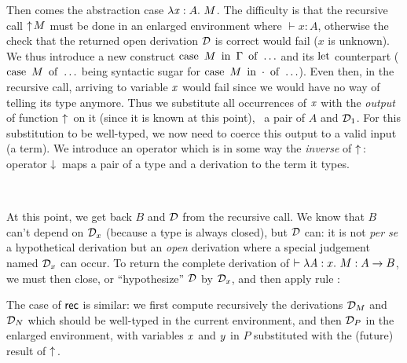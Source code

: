 \documentclass[9pt]{sigplanconf}
\begin{document}
Then comes the abstraction case $\lambda{\ensuremath{\text{\textit{x}}}}:{A}.\  M$. The difficulty is that
the recursive call $\uparrow\!{M}$ must be done in an enlarged
environment where $\vdash x : A$, otherwise the check that the
returned open derivation $\mathcal D$ is correct would fail ($x$ is
unknown). We thus introduce a new construct $\operatorname{case}\ {{M}\ \operatorname{in}\ {\Gamma}}\ \operatorname{of}\  \ldots$
and its $\operatorname{let}$ counterpart ($\operatorname{case}\ {M}\ \operatorname{of}\  \ldots$ being syntactic
sugar for $\operatorname{case}\ {{M}\ \operatorname{in}\ {\cdot}}\ \operatorname{of}\  \ldots$). Even then, in the recursive
call, arriving to variable $\text{\textit{x}}$ would fail since we would have no
way of telling its type anymore. Thus we substitute all occurrences of
$\text{\textit{x}}$ with the \emph{output} of function $\uparrow\!{}$ on it (since
it is known at this point), \ie\ a pair of $A$ and $\mathcal D_1$. For this
substitution to be well-typed, we now need to coerce this output to a
valid input (a term). We introduce an operator which is in some way
the \emph{inverse} of $\uparrow\!{}$: operator $\downarrow\!{}$ maps a pair of a
type and a derivation to the term it types.

\begin{mathleft}
  \quad{} \\
  \quad\quad
  {}
\end{mathleft}

At this point, we get back $B$ and $\mathcal D$ from the recursive call. We
know that $B$ can't depend on $\mathcal D_x$ (because a type is always
closed), but $\mathcal D$ can: it is not \emph{per se} a hypothetical
derivation but an \emph{open} derivation where a special judgement
named $\mathcal D_x$ can occur. To return the complete derivation of
$\vdash\lambda{\ensuremath{\text{\textit{A}}}}:{x}.\  M : A \to B$, we must then close, or ``hypothesize''
$\mathcal D$ by $\mathcal D_x$, and then apply rule :

\begin{mathleft}
  \quad\quad
  {}
\end{mathleft}

The case of $\text{\textsf{rec}}$ is similar: we first compute recursively the
derivations $\mathcal D_M$ and $\mathcal D_N$ which should be well-typed in the
current environment, and then $\mathcal D_P$ in the enlarged environment,
with variables $\text{\textit{x}}$ and $\text{\textit{y}}$ in $P$ substituted with the
(future) result of $\uparrow\!{}$.
\end{document}
